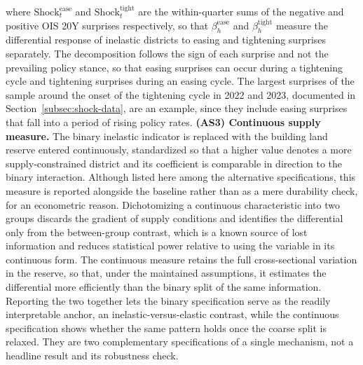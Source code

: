 \documentclass[a4paper,12pt, headsepline]{scrartcl}
\numberwithin{equation}{section}
\begin{document}
where $\text{Shock}^{\text{ease}}_t$ and $\text{Shock}^{\text{tight}}_t$ are the within-quarter sums of the negative and positive OIS 20Y surprises respectively, so that $\beta_h^{\text{ease}}$ and $\beta_h^{\text{tight}}$ measure the differential response of inelastic districts to easing and tightening surprises separately. The decomposition follows the sign of each surprise and not the prevailing policy stance, so that easing surprises can occur during a tightening cycle and tightening surprises during an easing cycle. The largest surprises of the sample around the onset of the tightening cycle in 2022 and 2023, documented in Section~\ref{subsec:shock-data}, are an example, since they include easing surprises that fall into a period of rising policy rates. \textbf{(AS3) Continuous supply measure.} The binary inelastic indicator is replaced with the building land reserve entered continuously, standardized so that a higher value denotes a more supply-constrained district and its coefficient is comparable in direction to the binary interaction. Although listed here among the alternative specifications, this measure is reported alongside the baseline rather than as a mere durability check, for an econometric reason. Dichotomizing a continuous characteristic into two groups discards the gradient of supply conditions and identifies the differential only from the between-group contrast, which is a known source of lost information and reduces statistical power relative to using the variable in its continuous form. The continuous measure retains the full cross-sectional variation in the reserve, so that, under the maintained assumptions, it estimates the differential more efficiently than the binary split of the same information. Reporting the two together lets the binary specification serve as the readily interpretable anchor, an inelastic-versus-elastic contrast, while the continuous specification shows whether the same pattern holds once the coarse split is relaxed. They are two complementary specifications of a single mechanism, not a headline result and its robustness check.
\end{document}

